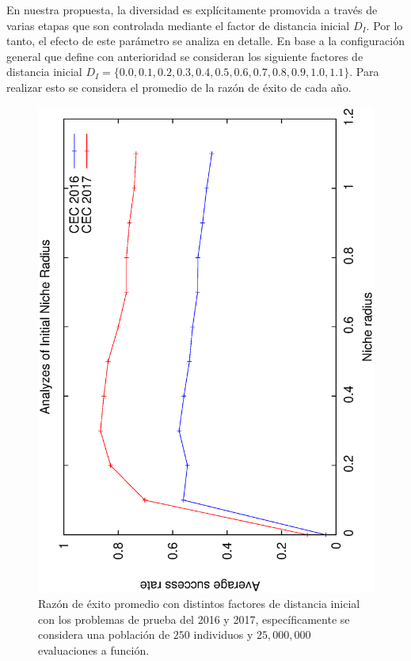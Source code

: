 En nuestra propuesta, la diversidad es explícitamente promovida a través de varias etapas que son controlada mediante el factor de distancia inicial $D_I$.
%
Por lo tanto, el efecto de este parámetro se analiza en detalle.
%
En base a la configuración general que define con anterioridad se consideran los siguiente factores de distancia inicial $D_I = \{0.0, 0.1, 0.2, 0.3, 0.4, 0.5, 0.6, 0.7, 0.8, 0.9, 1.0, 1.1 \}$.
%
Para realizar esto se considera el promedio de la razón de éxito de cada año.
%
%
\begin{figure}[t]
\centering
  \includegraphics[scale=0.3, angle=-90]{img/ED/Tuning_CEC.eps}
\caption{Razón de éxito promedio con distintos factores de distancia inicial con los problemas de prueba del \CEC{} 2016 y \CEC{} 2017, específicamente se considera una población de $250$ individuos y $25,000,000$ evaluaciones a función.}
\label{fig:one}
\end{figure}

